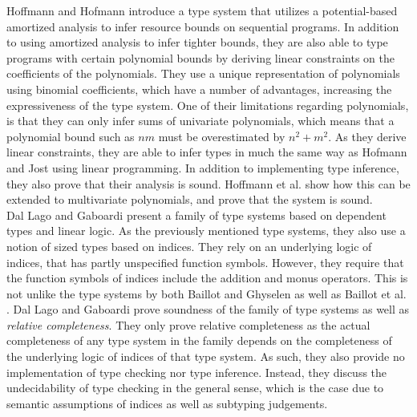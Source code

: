 Hoffmann and Hofmann \cite{HofmannAndHoffmann2010} introduce a type system that utilizes a potential-based amortized analysis to infer resource bounds on sequential programs. In addition to using amortized analysis to infer tighter bounds, they are also able to type programs with certain polynomial bounds by deriving linear constraints on the coefficients of the polynomials. They use a unique representation of polynomials using binomial coefficients, which have a number of advantages, increasing the expressiveness of the type system. One of their limitations regarding polynomials, is that they can only infer sums of univariate polynomials, which means that a polynomial bound such as $nm$ must be overestimated by $n^2 + m^2$. As they derive linear constraints, they are able to infer types in much the same way as Hofmann and Jost using linear programming. In addition to implementing type inference, they also prove that their analysis is sound. Hoffmann et al. \cite{HoffmannEtAl2012} show how this can be extended to multivariate polynomials, and prove that the system is sound.\\

Dal Lago and Gaboardi \cite{DalLagoGaboardi2011} present a family of type systems based on dependent types and linear logic. As the previously mentioned type systems, they also use a notion of sized types based on indices. They rely on an underlying logic of indices, that has partly unspecified function symbols. However, they require that the function symbols of indices include the addition and monus operators. This is not unlike the type systems by both Baillot and Ghyselen \cite{BaillotGhyselen2021} as well as Baillot et al. \cite{BaillotEtAl2021}. Dal Lago and Gaboardi prove soundness of the family of type systems as well as \textit{relative completeness}. They only prove relative completeness as the actual completeness of any type system in the family depends on the completeness of the underlying logic of indices of that type system. As such, they also provide no implementation of type checking nor type inference. Instead, they discuss the undecidability of type checking in the general sense, which is the case due to semantic assumptions of indices as well as subtyping judgements.\\



